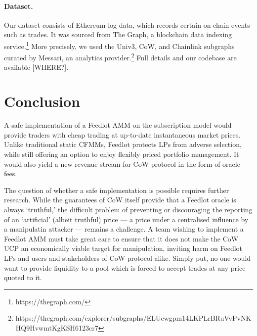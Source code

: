 \documentclass[a4paper,10pt]{article}
\theoremstyle{remark}
\begin{document}





\paragraph{Dataset.} Our dataset consists of Ethereum log data, which records certain on-chain events such as trades. It was sourced from The Graph, a blockchain data indexing service.\footnote{https://thegraph.com/}
%
More precisely, we used the Univ3, CoW, and Chainlink subgraphs curated by Messari, an analytics provider.\footnote{https://thegraph.com/explorer/subgraphs/ELUcwgpm14LKPLrBRuVvPvNKHQ9HvwmtKgKSH6123cr7}
%
Full details and our codebase are available [WHERE?].

\section{Conclusion}

A safe implementation of a Feedlot AMM on the subscription model would provide traders with cheap trading at up-to-date instantaneous market prices.
%
Unlike traditional static CFMMs, Feedlot protects LPs from adverse selection, while still offering an option to enjoy flexibly priced portfolio management. 
%
It would also yield a new revenue stream for CoW protocol in the form of oracle fees.

The question of whether a safe implementation is possible requires further research.
%
While the guarantees of CoW itself provide that a Feedlot oracle is always `truthful,' the difficult problem of preventing or discouraging the reporting of an `artificial' (albeit truthful) price --- a price under a centralised influence by a manipulatin attacker --- remains a challenge. 
%
A team wishing to implement a Feedlot AMM must take great care to ensure that it does not make the CoW UCP an economically viable target for manipulation, inviting harm on Feedlot LPs and users and stakeholders of CoW protocol alike.
%
Simply put, no one would want to provide liquidity to a pool which is forced to accept trades at any price quoted to it.
\end{document}
